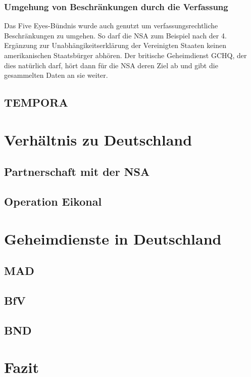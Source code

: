 \documentclass[12pt,a4paper]{scrartcl}
\begin{document}
\subsubsection{Umgehung von Beschränkungen durch die Verfassung}
Das Five Eyes-Bündnis wurde auch genutzt um verfassungsrechtliche Beschränkungen zu umgehen. So darf die NSA zum Beispiel nach der 4. Ergänzung zur Unabhängikeitserklärung der Vereinigten Staaten keinen amerikanischen Staatsbürger abhören. Der britische Geheimdienst GCHQ, der dies natürlich darf, hört dann für die NSA deren Ziel ab und gibt die gesammelten Daten an sie weiter.

\subsection{TEMPORA}

\section{Verhältnis zu Deutschland}

\subsection{Partnerschaft mit der NSA}

\subsection{Operation Eikonal}

\section{Geheimdienste in Deutschland}

\subsection{MAD}

\subsection{BfV}

\subsection{BND}

\section{Fazit}

\newpage
\printbibliography
\end{document}
